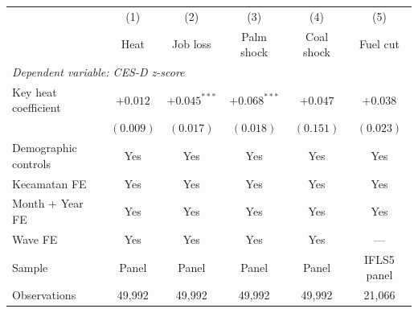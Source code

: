 \begin{tabular}{lccccc}
\toprule
 & (1) & (2) & (3) & (4) & (5) \\
 & Heat & Job loss & Palm shock & Coal shock & Fuel cut \\
\midrule
\multicolumn{6}{l}{\textit{Dependent variable: CES-D z-score}} \\
\addlinespace[2pt]
Key heat coefficient & $+0.012$ & $+0.045^{***}$ & $+0.068^{***}$ & $+0.047$ & $+0.038$ \\
 & $(0.009)$ & $(0.017)$ & $(0.018)$ & $(0.151)$ & $(0.023)$ \\
\midrule
Demographic controls & Yes & Yes & Yes & Yes & Yes \\
Kecamatan FE & Yes & Yes & Yes & Yes & Yes \\
Month + Year FE & Yes & Yes & Yes & Yes & Yes \\
Wave FE & Yes & Yes & Yes & Yes & --- \\
\addlinespace[3pt]
Sample & Panel & Panel & Panel & Panel & IFLS5 panel \\
Observations & 49,992 & 49,992 & 49,992 & 49,992 & 21,066 \\
\bottomrule
\end{tabular}
